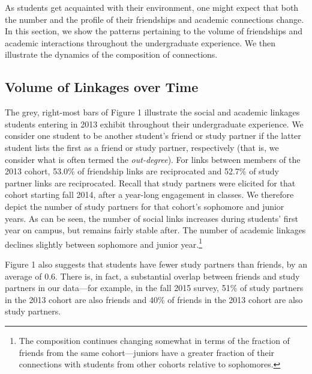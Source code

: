 \documentclass[12pt,letterpaper,english]{article}
\begin{document}
As students get acquainted with their environment, one might expect that both the number and the profile of their friendships and academic connections change. In this section, we show the patterns pertaining to the volume of friendships and academic interactions throughout the undergraduate experience. We then illustrate the dynamics of the composition of connections.

\subsection{Volume of Linkages over Time}
\label{sec:degree}



The grey, right-most bars of Figure 1 illustrate the social and academic linkages students entering in 2013 exhibit throughout their undergraduate experience. We consider one student to be another student's friend or study partner if the latter student lists the first as a friend or study partner, respectively (that is, we consider what is often termed the \textit{out-degree}). For links between members of the 2013 cohort, 53.0\% of friendship links are reciprocated and 52.7\% of study partner links are reciprocated.  Recall that study partners were elicited for that cohort starting fall 2014, after a year-long engagement in classes. We therefore depict the number of study partners for that cohort's sophomore and junior years. As can be seen, the number of social links increases during students' first year on campus, but remains fairly stable after. The number of academic linkages declines slightly between sophomore and junior year.\footnote{The composition continues changing somewhat in terms of the fraction of friends from the same cohort---juniors have a greater fraction of their connections with students from other cohorts relative to sophomores.} %

Figure 1 also suggests that students have fewer study partners than friends, by an average of $0.6$. There is, in fact, a substantial overlap between friends and study partners in our data---for example, in the fall 2015 survey, 51\% of study partners in the 2013 cohort are also friends and 40\% of friends in the 2013 cohort are also study partners.
\end{document}
